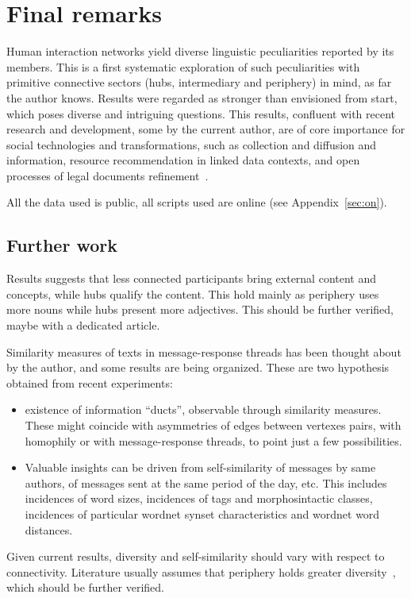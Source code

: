 \documentclass[%
 aip,
 jmp,%
 amsmath,amssymb,
 reprint,%
]{revtex4-1}
\begin{document}
\section{Final remarks}\label{sec:remarks}
Human interaction networks yield diverse linguistic peculiarities reported by its members. This is a first systematic exploration of such peculiarities with primitive connective sectors (hubs, intermediary and periphery) in mind, as far the author knows. Results were regarded as stronger than envisioned from start, which poses diverse and intriguing questions.
This results, confluent with recent research and development, some by the current author, are of core importance for social technologies and transformations, such as collection and diffusion and information, resource recommendation in linked data contexts, and open processes of legal documents refinement~\cite{ensaio,OPS,pnud5,evoSN,pbr}.

All the data used is public, all scripts used are online (see Appendix~\ref{sec:on}). 

\subsection{Further work}\label{subsec:fw}
Results suggests that less connected participants bring external content and concepts, while hubs qualify the content. This hold mainly as periphery uses more nouns while hubs present more adjectives. This should be further verified, maybe with a dedicated article.

Similarity measures of texts in message-response threads has been thought about by the author, and some results are being organized. These are two hypothesis obtained from recent experiments:
\begin{itemize}
    \item existence of information ``ducts'', observable through similarity measures. These might coincide with asymmetries of edges between vertexes pairs, with homophily or with message-response threads, to point just a few possibilities.
    \item Valuable insights can be driven from self-similarity of messages by same authors, of messages sent at the same period of the day, etc. This includes incidences of word sizes, incidences of tags and morphosintactic classes, incidences of particular wordnet synset characteristics and wordnet word distances.
\end{itemize}

Given current results, diversity and self-similarity should vary with respect to connectivity. Literature usually assumes that periphery holds greater diversity~\cite{easley}, which should be further verified.
\end{document}
